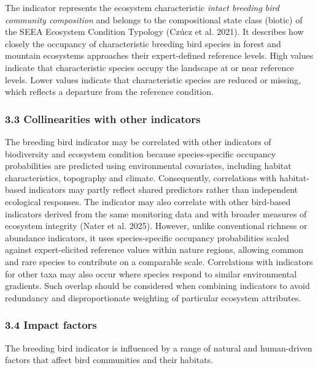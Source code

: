 \documentclass[
  letterpaper,
  DIV=11,
  numbers=noendperiod]{scrartcl}
\begin{document}
The indicator represents the ecosystem characteristic \emph{intact
breeding bird community composition} and belongs to the compositional
state class (biotic) of the SEEA Ecosystem Condition Typology (Czúcz et
al. 2021). It describes how closely the occupancy of characteristic
breeding bird species in forest and mountain ecosystems approaches their
expert-defined reference levels. High values indicate that
characteristic species occupy the landscape at or near reference levels.
Lower values indicate that characteristic species are reduced or
missing, which reflects a departure from the reference condition.

\subsubsection{3.3 Collinearities with other
indicators}\label{collinearities-with-other-indicators}

The breeding bird indicator may be correlated with other indicators of
biodiversity and ecosystem condition because species-specific occupancy
probabilities are predicted using environmental covariates, including
habitat characteristics, topography and climate. Consequently,
correlations with habitat-based indicators may partly reflect shared
predictors rather than independent ecological responses. The indicator
may also correlate with other bird-based indicators derived from the
same monitoring data and with broader measures of ecosystem integrity
(Nater et al. 2025). However, unlike conventional richness or abundance
indicators, it uses species-specific occupancy probabilities scaled
against expert-elicited reference values within nature regions, allowing
common and rare species to contribute on a comparable scale.
Correlations with indicators for other taxa may also occur where species
respond to similar environmental gradients. Such overlap should be
considered when combining indicators to avoid redundancy and
disproportionate weighting of particular ecosystem attributes.

\subsubsection{3.4 Impact factors}\label{impact-factors}

The breeding bird indicator is influenced by a range of natural and
human-driven factors that affect bird communities and their habitats.
\end{document}
